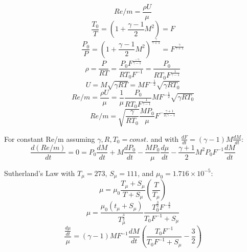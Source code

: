 \begin{equation}
    Re/m = \frac{\rho U}{\mu}
\end{equation}
\begin{equation}
    \frac{T_0}{T} = (1+\frac{\gamma-1}{2}M^2) = F
\end{equation}
\begin{equation}
    \frac{P_0}{P} = (1+\frac{\gamma-1}{2}M^2)^{\frac{\gamma}{\gamma+1}} = F^{\frac{\gamma}{\gamma+1}}
\end{equation}
\begin{equation}
    \rho = \frac{P}{R T} = \frac{P_0 F^{\frac{-\gamma}{\gamma-1}}}{R T_0 F^{-1}} = \frac{P_0}{R T_0 F^{\frac{1}{\gamma-1}}}
\end{equation}
\begin{equation}
    U = M \sqrt{\gamma R T} = M F^{-\frac{1}{2}} \sqrt{\gamma R T_0}
\end{equation}
\begin{equation*}
    Re/m = \frac{\rho U}{\mu} = \frac{1}{\mu} \frac{P_0}{R T_0 F^{\frac{1}{\gamma-1}}} M F^{-\frac{1}{2}} \sqrt{\gamma R T_0}
\end{equation*}
\begin{equation}
    Re/m = \sqrt{\frac{\gamma}{R T_0}} \frac{M P_0}{\mu} F^{-\frac{\gamma+1}{2(\gamma -1}}
\end{equation}

For constant Re/m assuming $\gamma, R, T_0 = const.$ and with $\frac{dF}{dt} = (\gamma-1)M \frac{dM}{dt}$:
\begin{equation}
    \frac{d(Re/m)}{dt} = 0 = P_0 \frac{dM}{dt} + M \frac{dP_0}{dt} - \frac{M P_0}{\mu} \frac{d\mu}{dt} - \frac{\gamma+1}{2} M^2 P_0 F^{-1} \frac{dM}{dt}
\end{equation}

Sutherland's Law with $T_\mu = 273$, $S_\mu = 111$, and $\mu_0 = 1.716 \times 10^{-5}$:
\begin{equation}
    \mu = \mu_0 \frac{T_\mu+S_\mu}{T+S_\mu} \left( \frac{T}{T_\mu} \right)
\end{equation}
\begin{equation}
    \mu = \frac{\mu_0(t_\mu+S_\mu)}{T_\mu^{\frac{3}{2}}} \frac{T_0^{\frac{3}{2}} F^{-\frac{3}{2}}}{T_0 F^{-1}+S_\mu}
\end{equation}
\begin{equation}
    \frac{\frac{d\mu}{dt}}{\mu} = (\gamma-1) M F^{-1} \frac{dM}{dt} \left( \frac{T_0 F^{-1}}{T_0 F^{-1} + S_\mu}-\frac{3}{2} \right)
\end{equation}

